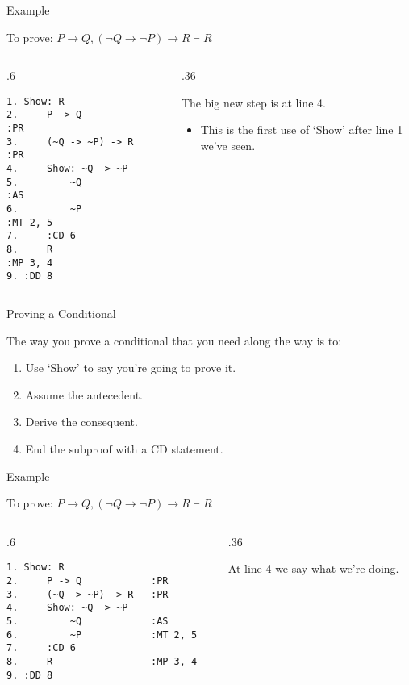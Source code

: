\documentclass[
  ignorenonframetext,
]{beamer}
\providecommand{\tightlist}{%
  \setlength{\itemsep}{0pt}\setlength{\parskip}{0pt}}
\renewcommand{\,}{\text{, }}
\def\begincols{\begin{columns}}
\def\begincol{\begin{column}}
\def\endcol{\end{column}}
\def\endcols{\end{columns}}
\begin{document}
\begin{frame}[fragile]{Example}
\protect\hypertarget{example-3}{}

To prove:
\(P \rightarrow Q, (\neg Q \rightarrow \neg P) \rightarrow R \vdash R\)

\bigskip

\begincols
\begincol{.6\textwidth}

\begin{verbatim}
1. Show: R
2.     P -> Q            :PR
3.     (~Q -> ~P) -> R   :PR
4.     Show: ~Q -> ~P
5.         ~Q            :AS
6.         ~P            :MT 2, 5
7.     :CD 6
8.     R                 :MP 3, 4
9. :DD 8
\end{verbatim}

\endcol
\begincol{.36\textwidth}

The big new step is at line 4.

\begin{itemize}
\tightlist
\item
  This is the first use of `Show' after line 1 we've seen.
\end{itemize}

\endcol
\endcols

\end{frame}

\begin{frame}{Proving a Conditional}
\protect\hypertarget{proving-a-conditional}{}

The way you prove a conditional that you need along the way is to:

\begin{enumerate}
\tightlist
\item
  Use `Show' to say you're going to prove it.
\item
  Assume the antecedent.
\item
  Derive the consequent.
\item
  End the subproof with a CD statement.
\end{enumerate}

\end{frame}

\begin{frame}[fragile]{Example}
\protect\hypertarget{example-4}{}

To prove:
\(P \rightarrow Q, (\neg Q \rightarrow \neg P) \rightarrow R \vdash R\)

\bigskip

\begincols
\begincol{.6\textwidth}

\begin{verbatim}
1. Show: R
2.     P -> Q            :PR
3.     (~Q -> ~P) -> R   :PR
4.     Show: ~Q -> ~P
5.         ~Q            :AS
6.         ~P            :MT 2, 5
7.     :CD 6
8.     R                 :MP 3, 4
9. :DD 8
\end{verbatim}

\endcol
\begincol{.36\textwidth}

At line 4 we say what we're doing.

\endcol
\endcols

\end{frame}
\end{document}
